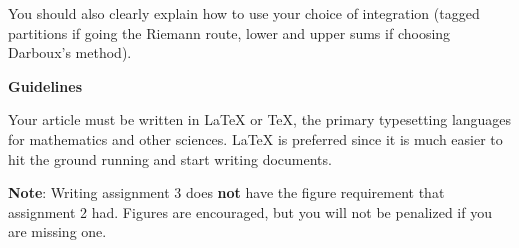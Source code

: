 \documentclass{article}
\begin{document}
    You should also clearly explain how to use your choice of integration
    (tagged partitions if going the Riemann route, lower and upper sums if
    choosing Darboux's method).
    \par\hfill\par
    \textbf{\Large{Guidelines}}
    \par\hfill\par
    Your article must be written in \LaTeX{} or \TeX, the primary typesetting
    languages for mathematics and other sciences. \LaTeX{} is preferred since it
    is much easier to hit the ground running and start writing documents.
    \par\hfill\par
    \textbf{Note}: Writing assignment 3 does \textbf{not} have the figure
    requirement that assignment 2 had. Figures are encouraged, but you will
    not be penalized if you are missing one.
\end{document}
